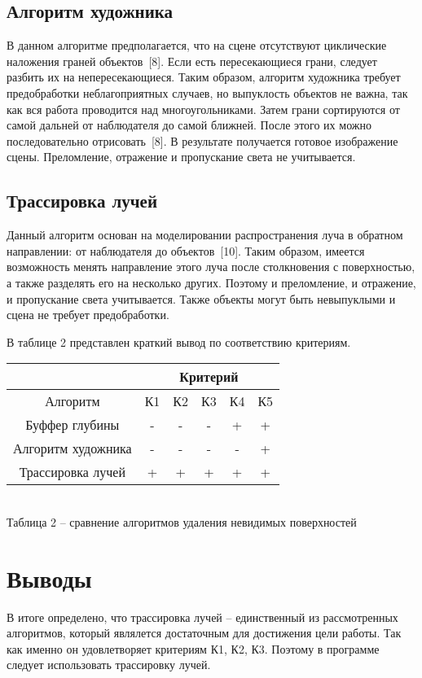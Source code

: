 {    \subsection{Алгоритм художника} {
        В данном алгоритме предполагается, что на сцене отсутствуют циклические
        наложения граней объектов~[8].
        Если есть пересекающиеся грани, следует разбить их на непересекающиеся.
        Таким образом, алгоритм художника требует предобработки неблагоприятных
        случаев, но выпуклость объектов не важна,
        так как вся работа проводится над многоугольниками.
        Затем грани сортируются от самой дальней от наблюдателя до самой ближней.
        После этого их можно последовательно отрисовать~[8].
        В результате получается готовое изображение сцены.
        Преломление, отражение и пропускание света не учитывается.
    }

    \subsection{Трассировка лучей} {
        Данный алгоритм основан на моделировании распространения луча в
        обратном направлении: от наблюдателя до объектов~[10].
        Таким образом, имеется возможность менять направление этого луча
        после столкновения с поверхностью, а также разделять его на несколько других.
        Поэтому и преломление, и отражение, и пропускание света учитывается.
        Также объекты могут быть невыпуклыми и сцена не требует предобработки.
    }
    
    В таблице 2 представлен краткий вывод по соответствию критериям.
    
    \begin{center}
        \begin{tabular} { |c|c|c|c|c|c| }
            \hline
            \hspace{0pt} & \multicolumn{5}{|c|}{Критерий} \\
            \hline
            Алгоритм & К1 & К2 & К3 & К4 & К5 \\
            \hline
            Буффер глубины & - & - & - & + & + \\
            \hline
            Алгоритм художника & - & - & - & - & +  \\
            \hline
            Трассировка лучей & + & + & + & + & + \\
            \hline
        \end{tabular}
        \\
        \vspace{2mm}
        \small {
            Таблица 2 -- сравнение алгоритмов удаления невидимых поверхностей
        }
    \end{center}

    \section*{Выводы} {
        В итоге определено, что трассировка лучей -- единственный из
        рассмотренных алгоритмов, который являлется достаточным для достижения
        цели работы.
        Так как именно он удовлетворяет критериям К1, К2, К3.
        Поэтому в программе следует использовать трассировку лучей.
    }
}